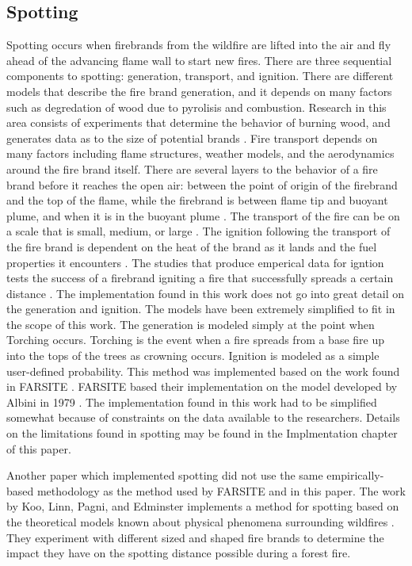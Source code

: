 \subsection{Spotting}
Spotting occurs when firebrands from the wildfire are lifted into the air and fly ahead of the advancing flame wall to start new fires. There are three sequential components to spotting: generation, transport, and ignition. There are different models that describe the fire brand generation, and it depends on many factors such as degredation of wood due to pyrolisis and combustion. Research in this area consists of experiments that determine the behavior of burning wood, and generates data as to the size of potential brands \cite{firebrandgen}. Fire transport depends on many factors including flame structures, weather models, and the aerodynamics around the fire brand itself. There are several layers to the behavior of a fire brand before it reaches the open air: between the point of origin of the firebrand and the top of the flame, while the firebrand is between flame tip and buoyant plume, and when it is in the buoyant plume \cite{transport1}. The transport of the fire can be on a scale that is small, medium, or large \cite{transport2}. The ignition following the transport of the fire brand is dependent on the heat of the brand as it lands and the fuel properties it encounters \cite{firetecSpotting}. The studies that produce emperical data for igntion tests the success of a firebrand igniting a fire that successfully spreads a certain distance \cite{ignition}. The implementation found in this work does not go into great detail on the generation and ignition. The models have been extremely simplified to fit in the scope of this work. The generation is modeled simply at the point when Torching occurs. Torching is the event when a fire spreads from a base fire up into the tops of the trees as crowning occurs. Ignition is modeled as a simple user-defined probability. This method was implemented based on the work found in FARSITE \cite{FARSITE}. FARSITE based their implementation on the model developed by Albini in 1979 \cite{ablini}. The implementation found in this work had to be simplified somewhat because of constraints on the data available to the researchers. Details on the limitations found in spotting may be found in the Implmentation chapter of this paper. 

Another paper which implemented spotting did not use the same empirically-based methodology as the method used by FARSITE and in this paper. The work by Koo, Linn, Pagni, and Edminster implements a method for spotting based on the theoretical models known about physical phenomena surrounding wildfires \cite{firetecSpotting}. They experiment with different sized and shaped fire brands to determine the impact they have on the spotting distance possible during a forest fire. 

